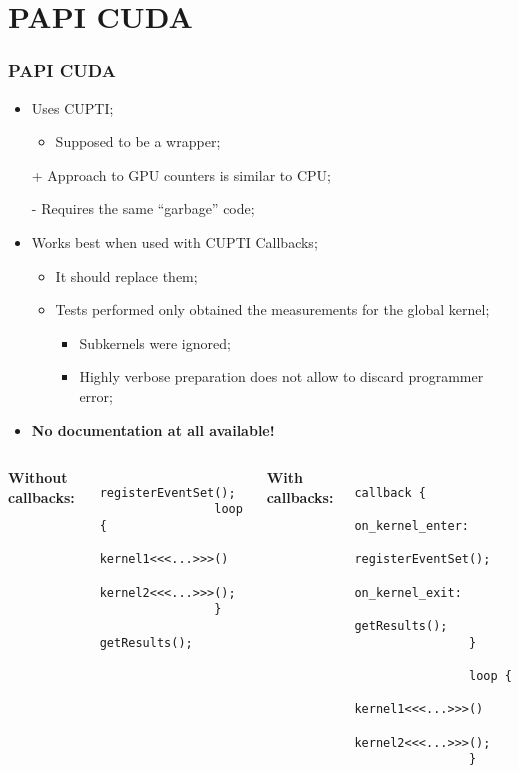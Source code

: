 \section{PAPI CUDA}

\begin{frame}
	\frametitle{PAPI CUDA}
	\begin{itemize}
		\item Uses CUPTI;
		\begin{itemize}
			\item Supposed to be a wrapper;
		\end{itemize}
		\vfill
		\item [+] Approach to GPU counters is similar to CPU;
		\vfill
		\item [-] Requires the same ``garbage'' code;
		\vfill
		\item Works best when used with CUPTI Callbacks;
		\begin{itemize}
			\item It should replace them;
			\item Tests performed only obtained the measurements for the global kernel;
			\begin{itemize}
				\item Subkernels were ignored;
				\item Highly verbose preparation does not allow to discard programmer error;
			\end{itemize}
		\end{itemize}
		\vfill
		\item \textbf{\larger No documentation at all available!}
	\end{itemize}
\end{frame}

\begin{frame}[fragile]
	\begin{columns}
			\textbf{Without callbacks:}
			\begin{verbatim}
				registerEventSet();
				loop {
				   kernel1<<<...>>>()
				   kernel2<<<...>>>();
				}
				getResults();
			\end{verbatim}
			\hfill

			\textbf{With callbacks:}
			\begin{verbatim}
				callback {
				   on_kernel_enter:
				      registerEventSet();
				   on_kernel_exit:
				      getResults();
				}

				loop {
				   kernel1<<<...>>>()
				   kernel2<<<...>>>();
				}
			\end{verbatim}

	\end{columns}

\end{frame}